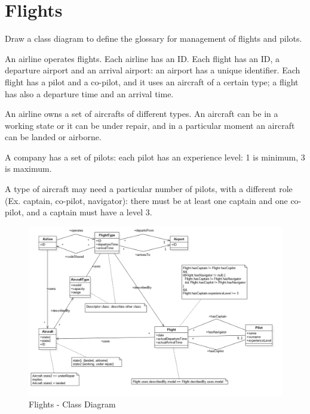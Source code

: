 \newpage
\section{Flights}
Draw a class diagram to define the glossary for management of flights and pilots.

An airline operates flights. Each airline has an ID. Each flight has an ID, a departure airport and an arrival airport: an airport has a unique identifier. Each flight has a pilot and a co-pilot, and it uses an aircraft of a certain type; a flight has also a departure time and an arrival time.

An airline owns a set of aircrafts of different types. An aircraft can be in a working state or it can be under repair, and in a particular moment an aircraft can be landed or airborne.

A company has a set of pilots: each pilot has an experience level: 1 is minimum, 3 is maximum.

A type of aircraft may need a particular number of pilots, with a different role (Ex. captain, co-pilot, navigator): there must be at least one captain and one co-pilot, and a captain must have a level 3.

\begin{figure}
\centering
\includegraphics[scale=0.5]{exercises/classDiagram_flights.png}
\caption{Flights - Class Diagram}
\end{figure}